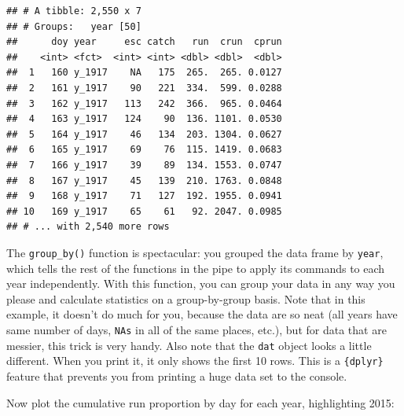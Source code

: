 \documentclass[]{book}
\newenvironment{Shaded}{\begin{snugshade}}{\end{snugshade}}
\newcommand{\KeywordTok}[1]{\textcolor[rgb]{0.13,0.29,0.53}{\textbf{#1}}}
\newcommand{\DataTypeTok}[1]{\textcolor[rgb]{0.13,0.29,0.53}{#1}}
\newcommand{\StringTok}[1]{\textcolor[rgb]{0.31,0.60,0.02}{#1}}
\newcommand{\OperatorTok}[1]{\textcolor[rgb]{0.81,0.36,0.00}{\textbf{#1}}}
\newcommand{\NormalTok}[1]{#1}
\theoremstyle{definition}
\theoremstyle{definition}
\theoremstyle{definition}
\theoremstyle{remark}
\begin{document}
\begin{Shaded}
\end{Shaded}

\begin{verbatim}
## # A tibble: 2,550 x 7
## # Groups:   year [50]
##      doy year     esc catch   run  crun  cprun
##    <int> <fct>  <int> <int> <dbl> <dbl>  <dbl>
##  1   160 y_1917    NA   175  265.  265. 0.0127
##  2   161 y_1917    90   221  334.  599. 0.0288
##  3   162 y_1917   113   242  366.  965. 0.0464
##  4   163 y_1917   124    90  136. 1101. 0.0530
##  5   164 y_1917    46   134  203. 1304. 0.0627
##  6   165 y_1917    69    76  115. 1419. 0.0683
##  7   166 y_1917    39    89  134. 1553. 0.0747
##  8   167 y_1917    45   139  210. 1763. 0.0848
##  9   168 y_1917    71   127  192. 1955. 0.0941
## 10   169 y_1917    65    61   92. 2047. 0.0985
## # ... with 2,540 more rows
\end{verbatim}

The \texttt{group\_by()} function is spectacular: you grouped the data
frame by \texttt{year}, which tells the rest of the functions in the
pipe to apply its commands to each year independently. With this
function, you can group your data in any way you please and calculate
statistics on a group-by-group basis. Note that in this example, it
doesn't do much for you, because the data are so neat (all years have
same number of days, \texttt{NAs} in all of the same places, etc.), but
for data that are messier, this trick is very handy. Also note that the
\texttt{dat} object looks a little different. When you print it, it only
shows the first 10 rows. This is a \texttt{\{dplyr\}} feature that
prevents you from printing a huge data set to the console.

Now plot the cumulative run proportion by day for each year,
highlighting 2015:
\end{document}
